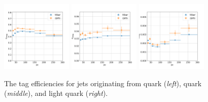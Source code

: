 \begin{figure}[h!]
    \centering
    \includegraphics[width=0.3\textwidth]{chapters/Analysis/sectionCalibration/figures/btag/bmva_mceff_vs_pt_b}
    \includegraphics[width=0.3\textwidth]{chapters/Analysis/sectionCalibration/figures/btag/bmva_mceff_vs_pt_c}
    \includegraphics[width=0.3\textwidth]{chapters/Analysis/sectionCalibration/figures/btag/bmva_mceff_vs_pt_usdg}
    \caption{The \PQb tag efficiencies for jets originating from \PQb quark (\emph{left}), \PQc quark (\emph{middle}), and light quark (\emph{right}).
    \label{fig:analysis:calibration:btag_eff}
    }
\end{figure}
\FloatBarrier









